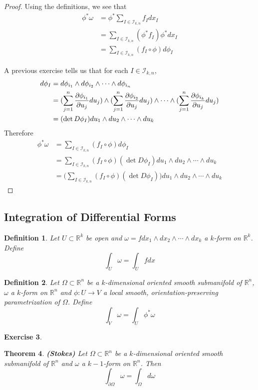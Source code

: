 \documentclass[12pt]{amsart}
\newtheorem{thm}{Theorem}[subsection]
\newtheorem{defn}[thm]{Definition}
\newtheorem{ex}[thm]{Exercise}
\newcommand{\om}{\omega}
\newcommand{\Om}{\Omega}
\newcommand{\R}{\mathbb{R}}
\newcommand{\MI}{\mathcal{I}}
\begin{document}
	\begin{proof}
		Using the definitions, we see that 
		\begin{align*}
			\phi^* \om 
			&= \phi^*  \sum_{I \in \MI_{k,n}} f_Idx_I \\
			&= \sum_{I \in \MI_{k,n}} (\phi^*f_I) \phi^*dx_I \\
			&= \sum_{I \in \MI_{k,n}} (f_I \circ  \phi)  d\phi_I
		\end{align*}
	
	A previous exercise tells us that for each $I \in \MI_{k,n}$,
	\begin{align*}
		d \phi_I 
		&= d\phi_{i_1} \wedge d\phi_{i_2} \wedge \cdots \wedge d \phi_{i_n} \\
		&= (\sum_{j = 1}^n \pdv{\phi_{i_1}}{u_j} du_j) \wedge (\sum_{j = 1}^n \pdv{\phi_{i_2}}{u_j} du_j) \wedge \cdots \wedge (\sum_{j = 1}^n \pdv{\phi_{i_k}}{u_j} du_j)   \\
		&= (\det D\phi_I)du_1 \wedge du_2 \wedge \cdots \wedge du_k
	\end{align*}
	Therefore 
	\begin{align*}
		\phi^* \om
		&= \sum_{I \in \MI_{k,n}} (f_I \circ  \phi)  d\phi_I \\
		&= \sum_{I \in \MI_{k,n}} (f_I \circ  \phi)  (\det D\phi_I)du_1 \wedge du_2 \wedge \cdots \wedge du_k \\
		&= \bigg(\sum_{I \in \MI_{k,n}} (f_I \circ  \phi)  (\det D\phi_I)\bigg)du_1 \wedge du_2 \wedge \cdots \wedge du_k
	\end{align*}
	\end{proof}
	
	\subsection{Integration of Differential Forms}
	
	\begin{defn}
		Let $U \subset \R^k$ be open and $\om = f dx_1 \wedge dx_2 \wedge \cdots \wedge dx_k$ a $k$-form on $\R^k$. Define $$\int_U \om = \int_U f dx$$
	\end{defn}
	
	\begin{defn}
		Let $\Om \subset \R^n$ be a $k$-dimensional oriented smooth submanifold of $\R^n$, $\om$ a $k$-form on $\R^n$ and $\phi: U \rightarrow V$ a local smooth, orientation-preserving parametrization of $\Om$. Define $$\int_V \om = \int_U \phi^*\om $$
	\end{defn} 

	\begin{ex}
		
	\end{ex}

	\begin{thm}{\textbf{(Stokes)}}
		Let $\Om \subset \R^n$ be a $k$-dimensional oriented smooth submanifold of $\R^n$ and $\om$ a $k-1$-form on $\R^n$. Then $$\int_{\partial \Om} \om = \int_\Om d \om$$
	\end{thm}
\end{document}
